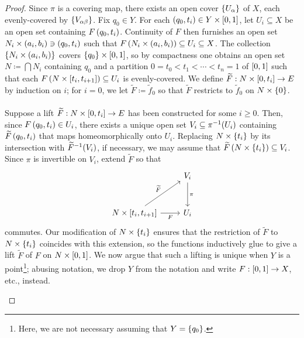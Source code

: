 \documentclass[../Moduli_Spaces_of_Riemann_Surfaces.tex]{subfiles}
\begin{document}
    \begin{proof}
        Since $\pi$ is a covering map, there exists an open cover $\left\{U_\alpha\right\}$ of $X$, each evenly-covered by $\left\{V_{\alpha\beta}\right\}$. Fix $q_0\in Y$. For each $\left(q_0,t_i\right)\in Y\times\left[0,1\right]$, let $U_i\subseteq X$ be an open set containing $F\left(q_0,t_i\right)$. Continuity of $F$ then furnishes an open set $N_i\times\left(a_i,b_i\right)\ni\left(q_0,t_i\right)$ such that $F\left(N_i\times\left(a_i,b_i\right)\right)\subseteq U_i\subseteq X$. The collection $\left\{N_i\times\left(a_i,b_i\right)\right\}$ covers $\left\{q_0\right\}\times\left[0,1\right]$, so by compactness one obtains an open set $N\coloneqq\bigcap N_i$ containing $q_0$ and a partition $0=t_0<t_1<\cdots<t_n=1$ of $\left[0,1\right]$ such that each $F\left(N\times\left[t_i,t_{i+1}\right]\right)\subseteq U_i$ is evenly-covered. We define $\widetilde{F}:N\times\left[0,t_i\right]\to E$ by induction on $i$; for $i=0$, we let $\widetilde{F}\coloneqq\widetilde{f}_0$ so that $\widetilde{F}$ restricts to $\widetilde{f}_0$ on $N\times\left\{0\right\}$.\\\ \\
        Suppose a lift $\widetilde{F}:N\times\left[0,t_i\right]\to E$ has been constructed for some $i\geq0$. Then, since $F\left(q_0,t_i\right)\in U_i$, there exists a unique open set $V_i\subseteq\pi^{-1}\!\left(U_i\right)$ containing $\widetilde{F}\left(q_0,t_i\right)$ that maps homeomorphically onto $U_i$. Replacing $N\times\left\{t_i\right\}$ by its intersection with $\widetilde{F}^{-1}\!\left(V_i\right)$, if necessary, we may assume that $\widetilde{F}\left(N\times\left\{t_i\right\}\right)\subseteq V_i$. Since $\pi$ is invertible on $V_i$, extend $\widetilde{F}$ so that
        \begin{equation*}
            \begin{tikzcd}[row sep = 0.4in]
                & V_i \ar[d, "\pi"] \\
                N\times\l[t_i,t_{i+1}\r] \ar[r, "F"'] \ar[ur, "\widetilde{F}"] & U_i
            \end{tikzcd}
        \end{equation*}
        commutes. Our modification of $N\times\left\{t_i\right\}$ ensures that the restriction of $\widetilde{F}$ to $N\times\left\{t_i\right\}$ coincides with this extension, so the functions inductively glue to give a lift $\widetilde{F}$ of $F$ on $N\times\left[0,1\right]$. We now argue that such a lifting is unique when $Y$ is a point\footnote{Here, we are not necessary assuming that $Y=\left\{q_0\right\}$.}; abusing notation, we drop $Y$ from the notation and write $F:\left[0,1\right]\to X$, etc., instead.
        \begin{itemize}

\end{itemize}
\end{proof}
\end{document}
